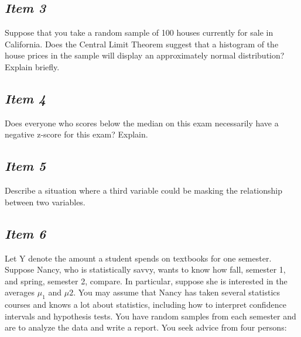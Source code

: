\subsection{\textbf{\textit{Item 3}}}
Suppose that you take a random sample of 100 houses currently for sale in California.  Does the Central Limit Theorem suggest that a histogram of the house prices in the sample will display an approximately normal distribution?  Explain briefly.

\subsection{\textbf{\textit{Item 4}}}
Does everyone who scores below the median on this exam necessarily have a negative z-score for this exam?  Explain.

\subsection{\textbf{\textit{Item 5}}}
%
Describe a situation
where a third variable could be masking the relationship between two variables.

\subsection{\textbf{\textit{Item 6}}}
Let Y denote the amount a student spends on textbooks for one semester. Suppose Nancy, who is statistically savvy, wants to know how fall, semester 1, and spring, semester 2, compare.  In particular, suppose she is interested in the averages $\mu_1$ and $\mu2$.  You may assume that Nancy has taken several statistics courses and knows a lot about statistics, including how to interpret confidence intervals and hypothesis tests.  You have random samples from each semester and are to analyze the data and write a report.  You seek advice from four persons:

